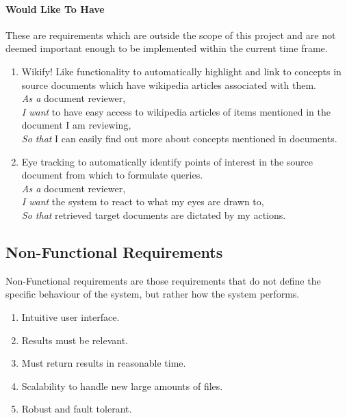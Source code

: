 \documentclass{l4proj}
\begin{document}
\paragraph{Would Like To Have}
These are requirements which are outside the scope of this project and are not deemed important enough to be implemented within the current time frame.
\begin{enumerate}[label=\textbf{W.\arabic*}]
\item Wikify! Like functionality to automatically highlight and link to concepts in source documents which have wikipedia articles associated with them. \\
\textit{As a} document reviewer, \\
\textit{I want} to have easy access to wikipedia articles of items mentioned in the document I am reviewing, \\
\textit{So that} I can easily find out more about concepts mentioned in documents.
\item Eye tracking to automatically identify points of interest in the source document from which to formulate queries. \\
\textit{As a} document reviewer, \\
\textit{I want} the system to react to what my eyes are drawn to, \\
\textit{So that} retrieved target documents are dictated by my actions.
\end{enumerate}
\subsection{Non-Functional Requirements}
Non-Functional requirements are those requirements that do not define the specific behaviour of the system, but rather how the system performs.
\begin{enumerate}[label=\textbf{NF.\arabic*}]
\item Intuitive user interface.
\item Results must be relevant.
\item Must return results in reasonable time.
\item Scalability to handle new large amounts of files. 
\item Robust and fault tolerant.
\end{enumerate}
\end{document}
